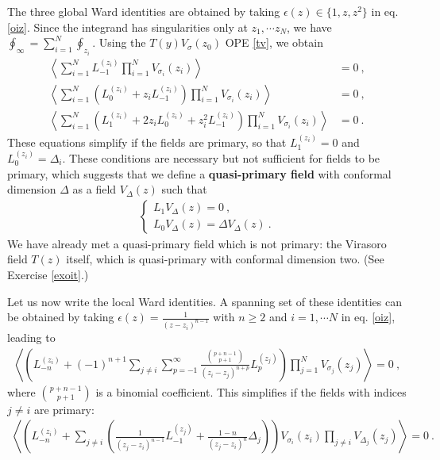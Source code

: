 \documentclass[12pt,a4paper,notitlepage]{report}
\numberwithin{equation}{section}
\theoremstyle{break}
\begin{document}
The three global Ward identities are obtained by taking $\epsilon(z)\in \{1,z,z^2\}$ in eq. \eqref{oiz}.
Since the integrand has singularities only at $z_1,\cdots z_N$, we have $\oint_\infty=\sum_{i=1}^N \oint_{z_i}$.
Using the 
$T(y)V_\sigma(z_0)$ OPE \eqref{tv}, we obtain 
\begin{align}
\left\langle \sum_{i=1}^N L_{-1}^{(z_i)} \prod_{i=1}^N V_{\sigma_i}(z_i) \right\rangle &= 0 \ ,
\label{slz}
\\
\left\langle \sum_{i=1}^N \left( L_0^{(z_i)} + z_i L_{-1}^{(z_i)}\right) \prod_{i=1}^N V_{\sigma_i}(z_i) \right\rangle & = 0 \ ,
\label{sllz}
\\
\left\langle \sum_{i=1}^N \left( L_1^{(z_i)} + 2z_i L_0^{(z_i)} + z_i^2 L_{-1}^{(z_i)}\right) \prod_{i=1}^N V_{\sigma_i}(z_i) \right\rangle & = 0\ .
\label{slllz}
\end{align}
These equations simplify if the fields are primary, so that $L_1^{(z_i)}=0$ and $L_0^{(z_i)}=\Delta_i$. 
These conditions are necessary but not sufficient for fields to be primary, which suggests that we define a
\textbf{\boldmath quasi-primary field} with conformal dimension $\Delta$ as a field $V_\Delta(z)$ such that 
\begin{align}
 \left\{\begin{array}{l}  L_1 V_\Delta(z) = 0 \ , 
\\
L_0 V_\Delta(z) = \Delta V_\Delta(z) \ .
\end{array}\right. 
\label{lolz}
\end{align}
We have already met a quasi-primary field which is not primary: the Virasoro field $T(z)$ itself, which is quasi-primary with conformal dimension two. (See Exercise \eqref{exoit}.) 

Let us now write the local Ward identities.
A spanning set of these identities can be obtained by taking $\epsilon(z) = \frac{1}{(z-z_i)^{n-1}}$ with $n\geq 2$ and $i=1, \cdots N$ in eq. \eqref{oiz}, leading to
\begin{align}
 \left\langle \left( L_{-n}^{(z_i)} + (-1)^{n+1}\sum_{j\neq i}\sum_{p=-1}^\infty \frac{\binom{p+n-1}{p+1}}{(z_i-z_j)^{n+p}} L_p^{(z_j)}\right)  \prod_{j=1}^N V_{\sigma_j}(z_j) \right\rangle = 0\ ,
\label{lwi}
\end{align}
where $\binom{p+n-1}{p+1}$ is a binomial coefficient.
This simplifies if the fields with indices $j\neq i$ are primary:
\begin{align}
 \left\langle \left( L_{-n}^{(z_i)} + \sum_{j\neq i} \left(\frac{1}{(z_j-z_i)^{n-1}} L_{-1}^{(z_j)}  + \frac{1-n}{(z_j-z_i)^n} \Delta_j\right)\right) V_{\sigma_i}(z_i)\prod_{j\neq i} V_{\Delta_j}(z_j) \right\rangle =0\ .
\label{lwp}
\end{align}
\end{document}
